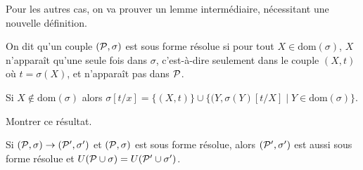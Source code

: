 Pour les autres cas, on va prouver un lemme intermédiaire, nécessitant une nouvelle définition.

\begin{defi}
    On dit qu'un couple $(\mathcal P,\sigma)$ est sous forme résolue si pour tout $X\in\mathrm{dom}(\sigma)$, $X$ n'apparaît qu'une seule fois dans $\sigma$, c'est-à-dire seulement dans le couple $(X,t)$ où $t = \sigma(X)$, et n'apparaît pas dans $\mathcal P$.
\end{defi}

\begin{lem}
    Si $X\notin\mathrm{dom}(\sigma)$ alors $\sigma[t/x] = \{(X,t)\}\cup\{(Y,\sigma(Y)[t/X]\mid Y\in\mathrm{dom}(\sigma)\}$.
\end{lem}

\begin{exo}
    Montrer ce résultat.
\end{exo}

\begin{lem}
    Si $(\mathcal P,\sigma)\to(\mathcal P',\sigma')$ et $(\mathcal P,\sigma)$ est sous forme résolue, alors $(\mathcal P',\sigma')$ est aussi sous forme résolue et $U(\mathcal P\cup\sigma) = U(\mathcal P'\cup\sigma')$.
\end{lem}

